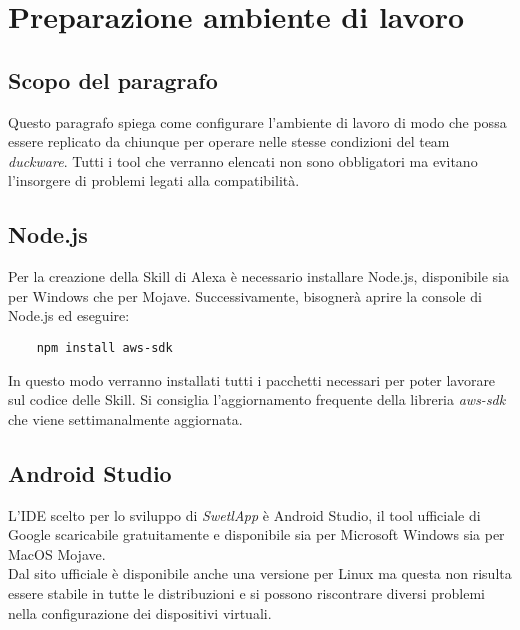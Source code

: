 \pagebreak

\section{Preparazione ambiente di lavoro}
\label{sec:ambientelavoro}
\subsection{Scopo del paragrafo}
Questo paragrafo spiega come configurare l'ambiente di lavoro di modo che possa essere replicato da chiunque per operare nelle stesse condizioni del team \textit{duckware}. Tutti i tool che verranno elencati non sono obbligatori ma evitano l'insorgere di problemi legati alla compatibilità.

\subsection{Node.js}
Per la creazione della Skill di Alexa è necessario installare Node.js, disponibile sia per Windows che per Mojave. Successivamente, bisognerà aprire la console di Node.js ed eseguire:
\begin{verbatim}
    npm install aws-sdk
\end{verbatim}
In questo modo verranno installati tutti i pacchetti necessari per poter lavorare sul codice delle Skill. Si consiglia l'aggiornamento frequente della libreria \emph{aws-sdk} che viene settimanalmente aggiornata.

\subsection{Android Studio}
L'IDE scelto per lo sviluppo di \textit{SwetlApp} è Android Studio, il tool ufficiale di Google scaricabile gratuitamente e disponibile sia per Microsoft Windows sia per MacOS Mojave.\\[0.25cm]
Dal sito ufficiale è disponibile anche una versione per Linux ma questa non risulta essere stabile in tutte le distribuzioni e si possono riscontrare diversi problemi nella configurazione dei dispositivi virtuali.

